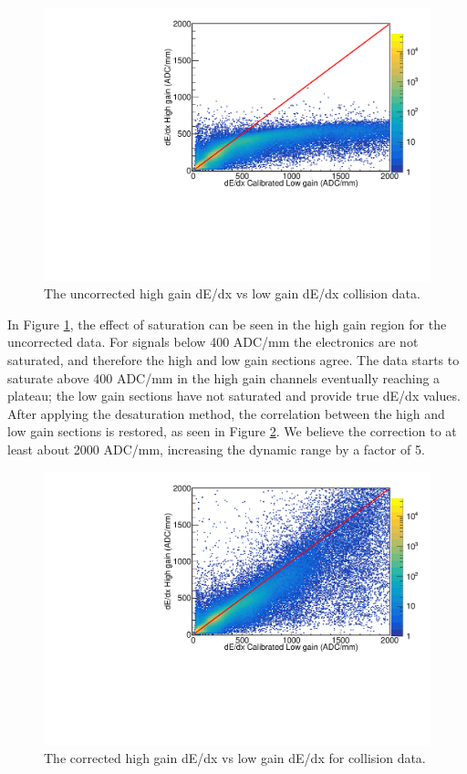 \documentclass[review]{elsarticle}
\begin{document}
\begin{figure}[H]
\includegraphics[width=\linewidth]{dedxcompare_nodesat}
\caption{The uncorrected high gain dE/dx vs low gain dE/dx collision data.  }
\label{fig:lowvshigh_raw}
\end{figure}
 
In Figure \ref{fig:lowvshigh_raw}, the effect of saturation can be seen in the high gain region for the uncorrected data. For signals below 400 ADC/mm the electronics are not saturated, and therefore the high and low gain sections agree. The data starts to saturate above 400 ADC/mm in the high gain channels eventually reaching a plateau; the low gain sections have not saturated and provide true dE/dx values.
 After applying the desaturation method, the correlation between the high and low gain sections is restored, as seen in Figure \ref{fig:lowvshigh_desat}. We believe the correction to at least about 2000 ADC/mm, increasing the dynamic range by a factor of 5.

\begin{figure}[H]
\includegraphics[width=\linewidth]{dedxcompare_new}
\caption{The corrected high gain dE/dx vs low gain dE/dx for collision data.  }
\label{fig:lowvshigh_desat}
\end{figure}
\end{document}
